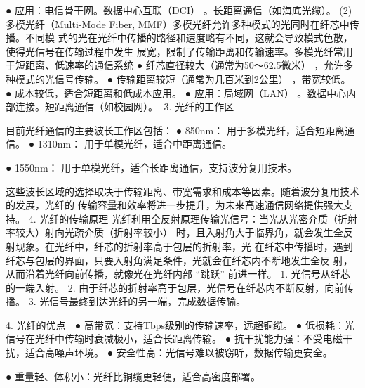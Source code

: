   ● 应用：电信骨干网。数据中心互联（DCI）          。长距离通信（如海底光缆）。
(2) 多模光纤（Multi-Mode Fiber, MMF）多模光纤允许多种模式的光同时在纤芯中传播。不同模
式的光在光纤中传播的路径和速度略有不同，这就会导致模式色散，使得光信号在传输过程中发生
展宽，限制了传输距离和传输速率。多模光纤常用于短距离、低速率的通信系统
  ● 纤芯直径较大（通常为50～62.5微米）        ，允许多种模式的光信号传输。
  ● 传输距离较短（通常为几百米到2公里）          ，带宽较低。
  ● 成本较低，适合短距离和低成本应用。
  ● 应用：局域网（LAN）   。数据中心内部连接。短距离通信（如校园网）。
3.   光纤的工作区




目前光纤通信的主要波长工作区包括：
  ● 850nm： 用于多模光纤，适合短距离通信。
  ● 1310nm： 用于单模光纤，适合中距离通信。

  ● 1550nm： 用于单模光纤，适合长距离通信，支持波分复用技术。

这些波长区域的选择取决于传输距离、带宽需求和成本等因素。随着波分复用技术的发展，光纤的
传输容量和效率将进一步提升，为未来高速通信网络提供强大支持。
4. 光纤的传输原理
光纤利用全反射原理传输光信号：当光从光密介质（折射率较大）射向光疏介质（折射率较小）
时，且入射角大于临界角，就会发生全反射现象。在光纤中，纤芯的折射率高于包层的折射率，光
在纤芯中传播时，遇到纤芯与包层的界面，只要入射角满足条件，光就会在纤芯内不断地发生全反
射，从而沿着光纤向前传播，就像光在光纤内部 “跳跃” 前进一样。
 1. 光信号从纤芯的一端入射。
 2. 由于纤芯的折射率高于包层，光信号在纤芯内不断反射，向前传播。
 3. 光信号最终到达光纤的另一端，完成数据传输。

4. 光纤的优点
 ●  高带宽：支持Tbps级别的传输速率，远超铜缆。
  ● 低损耗：光信号在光纤中传输时衰减极小，适合长距离传输。
  ● 抗干扰能力强：不受电磁干扰，适合高噪声环境。
  ● 安全性高：光信号难以被窃听，数据传输更安全。

  ● 重量轻、体积小：光纤比铜缆更轻便，适合高密度部署。

